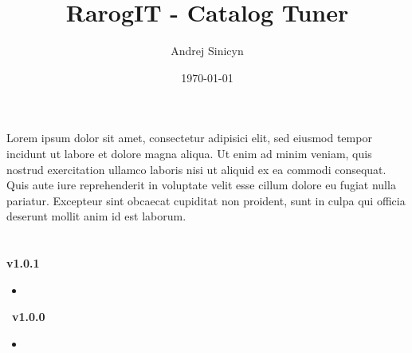 \date{\today}
\author{Andrej Sinicyn}
\title{RarogIT - Catalog Tuner}
\def\pdfsubject{Catalog Tuner for Magento}
\def\pdfkeywords{Catalog Tuner;Magento}
\def\logopath{../media/logo/rarog-it-logo.png}
\def\bigtitleimage{../media/box/catalog-tuner-box.png}



\chapter{
         }
Lorem ipsum dolor sit amet, consectetur adipisici elit, sed eiusmod tempor incidunt ut labore et dolore magna aliqua. Ut enim ad minim veniam, quis nostrud exercitation ullamco laboris nisi ut aliquid ex ea commodi consequat. Quis aute iure reprehenderit in voluptate velit esse cillum dolore eu fugiat nulla pariatur. Excepteur sint obcaecat cupiditat non proident, sunt in culpa qui officia deserunt mollit anim id est laborum.\\
\chapter{
         }
\textbf{v1.0.1}
\begin{itemize}
\item
{}
\end{itemize}\
\textbf{v1.0.0}
\begin{itemize}
\item
{}
\end{itemize}

